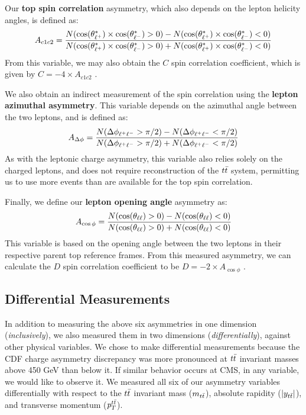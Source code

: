 Our \textbf{top spin correlation} asymmetry, which also depends on the
lepton helicity angles, is defined as:
\begin{equation}
A_{c1c2} = \frac{N(\cos(\theta^*_{\ell^+}) \times \cos(\theta^*_{\ell^-})>0) - N(\cos(\theta^*_{\ell^+}) \times \cos(\theta^*_{\ell^-})<0)}{N(\cos(\theta^*_{\ell^+}) \times \cos(\theta^*_{\ell^-})>0) + N(\cos(\theta^*_{\ell^+}) \times \cos(\theta^*_{\ell^-})<0)}
\end{equation}
From this variable, we may also obtain the $C$ spin correlation
coefficient, which is given by $C = -4 \times A_{c1c2}$ \cite{spincorrpolcoeff}.

We also obtain an indirect measurement of the spin correlation using
the \textbf{lepton azimuthal asymmetry}. This variable depends on the
azimuthal angle between the two leptons, and is defined as:
\begin{equation}
A_{\Delta\phi} = \frac{N(\Delta\phi_{\ell^+\ell^-}>\pi/2) - N(\Delta\phi_{\ell^+\ell^-}<\pi/2)}{N(\Delta\phi_{\ell^+\ell^-}>\pi/2) + N(\Delta\phi_{\ell^+\ell^-}<\pi/2)}
\end{equation}
As with the leptonic charge asymmetry, this variable also relies
solely on the charged leptons, and does not require reconstruction of
the $t\bar{t}$ system, permitting us to use more events than are
available for the top spin correlation.

Finally, we define our \textbf{lepton opening angle} asymmetry as:
\begin{equation}
A_{\cos\phi} = \frac{N(\cos(\theta_{\ell\ell})>0) - N(\cos(\theta_{\ell\ell})<0)}{N(\cos(\theta_{\ell\ell})>0) + N(\cos(\theta_{\ell\ell})<0)}
\end{equation}
This variable is based on the opening angle between the two leptons in
their respective parent top reference frames. From this measured
asymmetry, we can calculate the $D$ spin correlation coefficient to be
$D = -2 \times A_{\cos\phi}$ \cite{spincorrpolcoeff}.

\subsection{Differential Measurements}
\label{ssec:afb:varsdifferential}

In addition to measuring the above six asymmetries in one dimension
(\emph{inclusively}), we also measured them in two dimensions
(\emph{differentially}), against other physical variables.
We chose to make differential measurements because the CDF charge asymmetry
discrepancy was more pronounced at $t\bar{t}$ invariant masses above 450 %
GeV than below it. If similar behavior occurs at CMS, in any variable,
we would like to observe it. We measured all six of our asymmetry
variables differentially with respect to the $t\bar{t}$ invariant mass
($m_{t\bar{t}}$), absolute rapidity ($|y_{t\bar{t}}|$), and transverse momentum ($p_T^{t\bar{t}}$).

